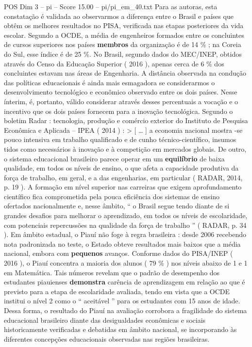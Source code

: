 \begin{textsample}{POS Dim 3 – pi – Score 15.00 – pi/pi\_em\_40.txt}
Para as autoras, esta constatação é validada ao observarmos a diferença entre o Brasil e países que obtêm os melhores resultados no PISA, verificada nas etapas posteriores da vida escolar.
Segundo a OCDE, a média de engenheiros formados entre os concluintes de cursos superiores nos países \textbf{membros} da organização é de 14 \% ; na Coreia do Sul, esse índice é de 25 \%.
No Brasil, segundo dados do MEC/INEP, obtidos através do Censo da Educação Superior ( 2016 ), apenas cerca de 6 \% dos concluintes estavam nas áreas de Engenharia.
A distância observada na condução das políticas educacionais é ainda mais esmagadora se considerarmos o desenvolvimento tecnológico e econômico observado entre os dois países.
Nesse ínterim, é, portanto, válido considerar através desses percentuais a vocação e o incentivo que os dois países fornecem para a inovação tecnológica.
Segundo o boletim Radar : tecnologia, produção e comércio exterior do Instituto de Pesquisa Econômica e Aplicada – IPEA ( 2014 ) : > [ … ] a economia nacional mostra -se pouco intensiva em trabalho qualificado e de cunho técnico-científico, insumos tidos como necessários à inovação e à competição em mercados globais.
De outro, o sistema educacional brasileiro parece operar em um \textbf{equilíbrio} de baixa qualidade, em todos os níveis de ensino, o que afeta a capacidade produtiva da força de trabalho, em geral, e a das engenharias, em particular ( RADAR, 2014, p. 19 ).
A formação em nível superior nas carreiras que exigem aprofundamento científico fica comprometida pela pouca eficiência dos sistemas de ensino ofertados nacionalmente e, nesse âmbito, “ o Brasil segue tendo diante de si grandes desafios para melhorar o aprendizado, em todos os níveis de escolaridade, com potenciais repercussões na qualidade da força de trabalho ” ( RADAR, p. 34 ).
Em âmbito estadual, o Piauí não foge à regra brasileira : desde 2006 recebendo nota padronizada no teste, o Estado obteve resultados mais baixos que a média nacional, embora com \textbf{pequenos} avanços.
Conforme dados do PISA/INEP ( 2016 ), o Piauí concentra a maioria dos alunos ( 79 \% ) nos níveis abaixo de 1 e 1 em Matemática.
Tais números revelam que o padrão de desempenho dos estudantes piauienses \textbf{demonstra} carência de aprendizagem em relação ao que é previsto para a etapa de escolaridade avaliada, tendo em vista que a OCDE institui o nível 2 como o “ aceitável ” para os estudantes com 15 anos de idade.
Dessa forma, o resultado do Piauí na avaliação corrobora a fragilidade do sistema educacional brasileiro diante das desigualdades econômicas e sociais historicamente verificadas e debatidas em âmbito nacional, se incorporando às diferentes concepções educacionais observadas nas regiões brasileiras.

\end{textsample}
